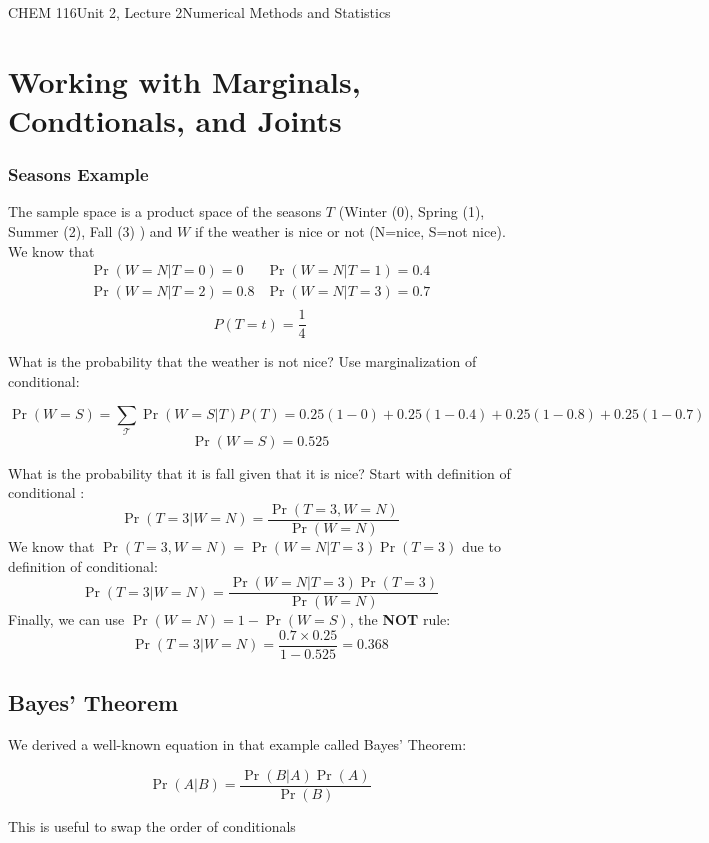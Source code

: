 \documentclass{article}
\begin{document}
\begin{tdoc}{CHEM 116}{Unit 2, Lecture 2}{Numerical Methods and Statistics}

 \section{Working with Marginals, Condtionals, and Joints}

\subsubsection{Seasons Example}

The sample space is a product space of the seasons $T$ (Winter (0), Spring
(1), Summer (2), Fall (3) ) and $W$ if the weather is nice or not (N=nice,
S=not nice). We know that
\[
\begin{array}{lr}
\Pr(W=N|T=0) = 0 & \Pr(W=N|T=1) = 0.4\\
\Pr(W=N|T=2) = 0.8 & \Pr(W=N|T=3) = 0.7\\
\end{array}
\]
\[
P(T=t) = \frac{1}{4}
\]

What is the probability that the weather is not nice? Use
marginalization of conditional:

\[
\Pr(W=S) = \sum_\mathcal{T} \Pr(W=S | T) P(T) = 0.25(1 - 0) + 0.25(1 - 0.4) + 0.25(1 - 0.8) + 0.25(1 - 0.7)
\]
\[
\Pr(W=S) = 0.525
\]

What is the probability that it is fall given that it is nice? Start with definition of conditional :
\[
\Pr(T=3|W=N) = \frac{\Pr(T=3, W=N)}{\Pr(W=N)}
\]
We know that $\Pr(T=3, W=N) = \Pr(W=N|T=3)\Pr(T=3)$ due to definition of conditional:
\[
\Pr(T=3|W=N) = \frac{\Pr(W=N|T=3)\Pr(T=3)}{\Pr(W=N)}
\]
Finally, we can use $\Pr(W=N) = 1 - \Pr(W=S)$, the {\bf NOT} rule:
\[
\Pr(T=3|W=N) = \frac{0.7\times 0.25}{1 - 0.525} = 0.368
\]

\subsection{Bayes' Theorem}

We derived a well-known equation in that example called Bayes' Theorem: 

\begin{equation}
\Pr(A|B) = \frac{\Pr(B|A)\Pr(A)}{\Pr(B)}
\end{equation}

This is useful to swap the order of conditionals


\end{tdoc}
\end{document}
